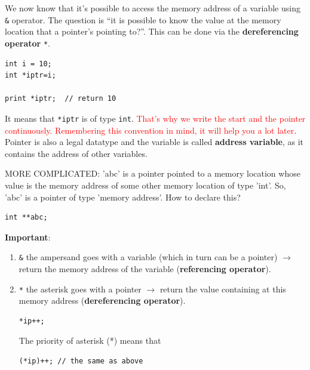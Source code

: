 

We now know that it's possible to access the memory address of a
variable using \verb!&! operator. The question is ``it is possible to
know the value at the memory location that a pointer's pointing
to?''. This can be done via the {\bf dereferencing operator} \verb!*!.

\begin{lstlisting}
int i = 10;
int *iptr=i;

print *iptr;  // return 10
\end{lstlisting}
It means that \verb!*iptr! is of type
\verb!int!. \textcolor{red}{That's why we write the start and the
pointer continuously. Remembering this convention in mind, it will
help you a lot later}. Pointer is also a legal datatype and the
variable is called {\bf address variable}, as it contains the address
of other variables. 

MORE COMPLICATED: 'abc' is a pointer pointed to a memory location whose value is
the memory address of some other memory location of type 'int'. So, 'abc' is a
pointer of type 'memory address'. How to declare this?
\begin{lstlisting}
int **abc;
\end{lstlisting}

{\bf Important}:
\begin{enumerate}
\item \verb!&! the ampersand goes with a variable (which in turn can
  be a pointer) $\rightarrow$ return the memory address of the
  variable ({\bf referencing operator}).
\item \verb!*! the asterisk goes with a pointer $\rightarrow$ return
  the value containing at this memory address
  ({\bf dereferencing operator}).
  
\begin{verbatim}
*ip++;
\end{verbatim}
The priority of asterisk (*) means that
\begin{verbatim}
(*ip)++; // the same as above
\end{verbatim}

\end{enumerate}

